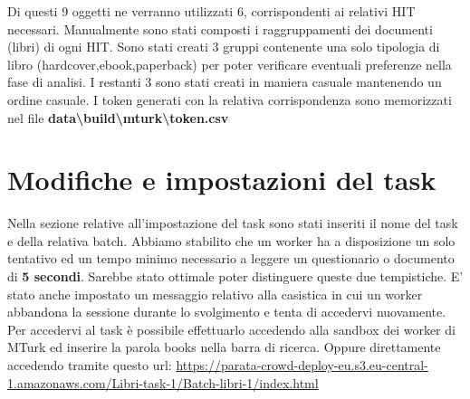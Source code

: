 \documentclass[a4paper,11pt]{report}
\begin{document}
Di questi 9 oggetti ne verranno utilizzati 6, corrispondenti ai relativi HIT necessari. Manualmente sono stati composti i raggruppamenti dei documenti (libri) di ogni HIT. Sono stati creati 3 gruppi contenente una solo tipologia di libro (hardcover,ebook,paperback) per poter verificare eventuali preferenze nella fase di analisi. I restanti 3 sono stati creati in maniera casuale mantenendo un ordine casuale.\newline
I token generati con la relativa corrispondenza sono memorizzati nel file \textbf{data\textbackslash build\textbackslash mturk\textbackslash token.csv}

\section{Modifiche e impostazioni del task}
Nella sezione relative all'impostazione del task sono stati inseriti il nome del task e della relativa batch. Abbiamo stabilito che un worker ha a disposizione un solo tentativo ed un tempo minimo necessario a leggere un questionario o documento di \textbf{5 secondi}. Sarebbe stato ottimale poter distinguere queste due tempistiche. E' stato anche impostato un messaggio relativo alla casistica in cui un worker abbandona la sessione durante lo svolgimento e tenta di accedervi nuovamente.\newline \newline
Per accedervi al task è possibile effettuarlo accedendo alla sandbox dei worker di MTurk ed inserire la parola books nella barra di ricerca. 
Oppure direttamente accedendo tramite questo url: \url{https://parata-crowd-deploy-eu.s3.eu-central-1.amazonaws.com/Libri-task-1/Batch-libri-1/index.html}
\end{document}
